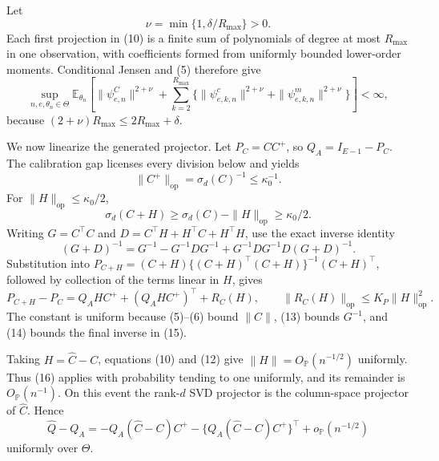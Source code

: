 Let
\[
 \nu=\min\{1,\delta/R_{\max}\}>0. \tag{11}
\]
Each first projection in (10) is a finite sum of polynomials of degree at most \(R_{\max}\) in one observation, with coefficients formed from uniformly bounded lower-order moments.  Conditional Jensen and (5) therefore give
\[
 \sup_{n,e,\theta_n\in\Theta}\mathbb E_{\theta_n}\!\left[
 \|\psi^C_{e,n}\|^{2+\nu}
 +\sum_{k=2}^{R_{\max}}
 \{\|\psi^c_{e,k,n}\|^{2+\nu}
   +\|\psi^m_{e,k,n}\|^{2+\nu}\}\right]<\infty, \tag{12}
\]
because \((2+\nu)R_{\max}\leq2R_{\max}+\delta\).

We now linearize the generated projector.  Let \(P_C=CC^+\), so \(Q_A=I_{E-1}-P_C\).  The calibration gap licenses every division below and yields
\[
 \|C^+\|_{\mathrm{op}}=\sigma_d(C)^{-1}\leq\kappa_0^{-1}. \tag{13}
\]
For \(\|H\|_{\mathrm{op}}\leq\kappa_0/2\),
\[
 \sigma_d(C+H)\geq\sigma_d(C)-\|H\|_{\mathrm{op}}
 \geq\kappa_0/2. \tag{14}
\]
Writing \(G=C^\top C\) and \(D=C^\top H+H^\top C+H^\top H\), use the exact inverse identity
\[
 (G+D)^{-1}=G^{-1}-G^{-1}DG^{-1}
 +G^{-1}DG^{-1}D(G+D)^{-1}. \tag{15}
\]
Substitution into \(P_{C+H}=(C+H)\{(C+H)^\top(C+H)\}^{-1}(C+H)^\top\), followed by collection of the terms linear in \(H\), gives
\[
 P_{C+H}-P_C
 =Q_AHC^+ +(Q_AHC^+)^\top+R_C(H),
 \qquad \|R_C(H)\|_{\mathrm{op}}\leq K_P\|H\|_{\mathrm{op}}^2. \tag{16}
\]
The constant is uniform because (5)--(6) bound \(\|C\|\), (13) bounds \(G^{-1}\), and (14) bounds the final inverse in (15).

Taking \(H=\widehat C-C\), equations (10) and (12) give \(\|H\|=O_{\mathbb P}(n^{-1/2})\) uniformly.  Thus (16) applies with probability tending to one uniformly, and its remainder is \(O_{\mathbb P}(n^{-1})\).  On this event the rank-\(d\) SVD projector is the column-space projector of \(\widehat C\).  Hence
\[
 \widehat Q-Q_A
 =-Q_A(\widehat C-C)C^+
  -\{Q_A(\widehat C-C)C^+\}^\top
  +o_{\mathbb P}(n^{-1/2}) \tag{17}
\]
uniformly over \(\Theta\).

